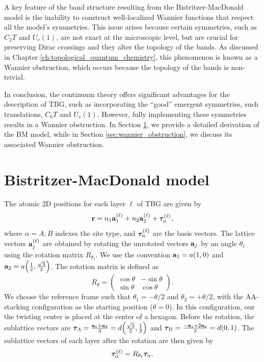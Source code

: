 A key feature of the band structure resulting from the Bistritzer-MacDonald model is the inability to construct well-localized Wannier functions that respect all the model's symmetries. This issue arises because certain symmetries, such as \(C_2 T\) and \(U_v(1)\), are not exact at the microscopic level, but are crucial for preserving Dirac crossings and they alter the topology of the bands. As discussed in Chapter \ref{ch:topological_quantum_chemistry}, this phenomenon is known as a Wannier obstruction, which occurs because the topology of the bands is non-trivial.

In conclusion, the continuum theory offers significant advantages for the description of TBG, such as incorporating the ``good'' emergent symmetries, such translations, \(C_6 T\) and \(U_v(1)\). However, fully implementing these symmetries results in a Wannier obstruction. In Section \ref{sec:BM-model}, we provide a detailed derivation of the BM model, while in Section \ref{sec:wannier_obstruction}, we discuss its associated Wannier obstruction.

\section{Bistritzer-MacDonald model} \label{sec:BM-model}


The atomic 2D positions for each layer $\ell$ of TBG are given by
\begin{equation} \label{eq:position-atoms-tbg}
{\vb{r}} = n_1 {\vb{a}}_{1}^{(\ell)} + n_2 {\vb{a}}_{2}^{(\ell)} + {\bm{\tau}}_{\alpha}^{(\ell)},
\end{equation}
where $\alpha = A, B$ indexes the site type, and ${\bm{\tau}}_{\alpha}^{(\ell)}$ are the basis vectors. The lattice vectors ${\vb{a}}_{j}^{(\ell)}$ are obtained by rotating the unrotated vectors ${\vb{a}}_j$ by an angle $\theta_\ell$ using the rotation matrix $R_{\theta_\ell}$. We use the convention ${\vb{a}}_1 = a(1,0)$ and ${\vb{a}}_2 = a\qty(\frac{1}{2}, \frac{\sqrt{3}}{2})$. The rotation matrix is defined as
\begin{equation} \label{eq:rotation-matrix}
R_\theta =
\begin{pmatrix}
\cos\theta & -\sin\theta \\
\sin\theta & \cos\theta
\end{pmatrix}.
\end{equation}
We choose the reference frame such that $\theta_1 = -\theta/2$ and $\theta_2 = +\theta/2$, with the AA-stacking configuration as the starting position ($\theta=0$). In this configuration, our the twisting center is placed at the center of a hexagon. Before the rotation, the sublattice vectors are ${\bm{\tau}}_A = \frac{{\vb{a}}_1 + {\vb{a}}_2}{3} = d\qty(\frac{\sqrt{3}}{2}, \frac{1}{2})$ and ${\bm{\tau}}_B = \frac{-{\vb{a}}_1 + 2{\vb{a}}_2}{3} = d(0,1)$. The sublattice vectors of each layer after the rotation are then given by
\begin{equation} \label{eq:tau_tbg_lattice_AB}
{\bm{\tau}}_{\alpha}^{(\ell)} = R_{\theta_\ell} {\bm{\tau}}_\alpha.
\end{equation}

